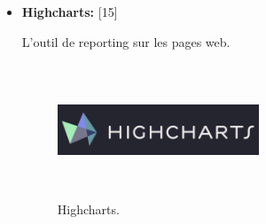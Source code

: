 \begin{itemize}
\item {  \textbf{ Highcharts:} } [15]


L'outil de \guillemotleft{} reporting \guillemotright{} sur les pages web.


\FloatBarrier
\begin{figure}[H]
\center
\includegraphics[width=6cm,height=4cm]{./figures/teklogos/highcharts.png}
\caption{Highcharts.}
\end{figure}
\FloatBarrier

\end{itemize}






















